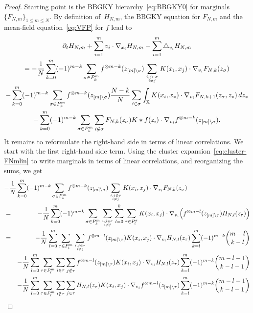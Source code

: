 \documentclass[a4paper,11pt,reqno,noindent]{amsart}
\theoremstyle{plain}
\theoremstyle{definition}
\numberwithin{equation}{section}
\newcommand{\Xd}{\mathbb X}
\begin{document}
\begin{proof}
Starting point is the BBGKY hierarchy~\eqref{eq:BBGKY0} for marginals $\{F_{N,m}\}_{1\le m\le N}$.
By definition of~$H_{N,m}$, the BBGKY equation for $F_{N,m}$ and the mean-field equation~\eqref{eq:VFP} for $f$ lead to
\begin{multline}\label{eq:pre-eqn-HNm}
\partial_tH_{N,m}+\sum_{i=1}^mv_i\cdot\nabla_{x_i}H_{N,m}
-\sum_{i=1}^m\triangle_{v_i}H_{N,m}\\
=-\frac1N\sum_{k=0}^m(-1)^{m-k}\sum_{\sigma\in P^m_k}f^{\otimes m-k}(z_{[m]\setminus\sigma})\sum_{i,j\in\sigma\atop i\ne j}K(x_i,x_j)\cdot\nabla_{v_i}F_{N,k}(z_\sigma)\\
-\sum_{k=0}^m(-1)^{m-k}\sum_{\sigma\in P^m_k}f^{\otimes m-k}(z_{[m]\setminus\sigma})\frac{N-k}N\sum_{i\in\sigma}\int_\Xd K(x_i,x_*)\cdot\nabla_{v_i}F_{N,k+1}(z_\sigma,z_*)\,dz_*\\
-\sum_{k=0}^m(-1)^{m-k}\sum_{\sigma\in P^m_k}\sum_{i\notin\sigma}F_{N,k}(z_\sigma)K\ast f(z_i)\cdot\nabla_{v_i}f^{\otimes m-k}(z_{[m]\setminus\sigma}).
\end{multline}
It remains to reformulate the right-hand side in terms of linear correlations. We start with the first right-hand side term.
Using the cluster expansion~\eqref{eq:cluster-FNmlin} to write marginals in terms of linear correlations, and reorganizing the sums, we get 
\begin{eqnarray*}
\lefteqn{-\frac1N\sum_{k=0}^m(-1)^{m-k}\sum_{\sigma\in P^m_k}f^{\otimes m-k}(z_{[m]\setminus\sigma})\sum_{i,j\in\sigma\atop i\ne j}K(x_i,x_j)\cdot\nabla_{v_i}F_{N,k}(z_\sigma)}\\
&=&-\frac1N\sum_{k=0}^m(-1)^{m-k}\sum_{\sigma\in P^m_k}\sum_{i,j\in\sigma\atop i\ne j}\sum_{l=0}^k\sum_{\tau\in P^\sigma_l}K(x_i,x_j)\cdot\nabla_{v_i}\Big(f^{\otimes m-l}(z_{[m]\setminus\tau})H_{N,l}(z_\tau)\Big)\\
&=&
-\frac1N\sum_{l=0}^m\sum_{\tau\in P^m_l}\sum_{i,j\in\tau\atop i\ne j}
f^{\otimes m-l}(z_{[m]\setminus\tau})K(x_i,x_j)\cdot\nabla_{v_i}H_{N,l}(z_\tau)
\sum_{k=l}^m(-1)^{m-k}\binom{m-l}{k-l}\\
&&-\frac1N\sum_{l=0}^m\sum_{\tau\in P^m_l}\sum_{i\in\tau}
\sum_{j\notin\tau}f^{\otimes m-l}(z_{[m]\setminus\tau})K(x_i,x_j)\cdot\nabla_{v_i}H_{N,l}(z_\tau)\sum_{k=l}^m(-1)^{m-k}\binom{m-l-1}{k-l-1}\\
&&-\frac1N\sum_{l=0}^m\sum_{\tau\in P^m_l}\sum_{i\notin\tau}\sum_{j\in\tau}H_{N,l}(z_\tau)K(x_i,x_j)\cdot\nabla_{v_i}f^{\otimes m-l}(z_{[m]\setminus\tau})\sum_{k=l}^m(-1)^{m-k}\binom{m-l-1}{k-l-1}\\

\end{eqnarray*}
\end{proof}
\end{document}
